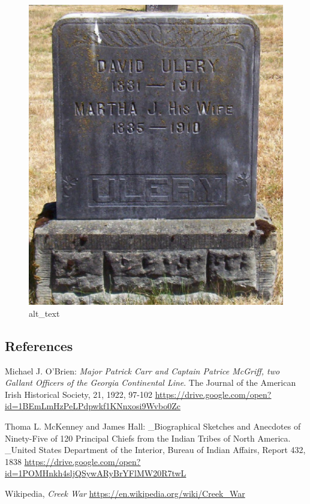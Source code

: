 \documentclass[
  12pt,
]{book}
\begin{document}
\begin{figure}
\centering
\includegraphics{images/0202b_images/image4.jpg}
\caption{alt\_text}
\end{figure}

\hypertarget{references-4}{%
\subsection{References}\label{references-4}}

Michael J. O'Brien: \emph{Major Patrick Carr and Captain Patrice McGriff, two Gallant Officers of the Georgia Continental Line}. The Journal of the American Irish Historical Society, 21, 1922, 97-102 \url{https://drive.google.com/open?id=1BEmLmHzPeLPdpwkf1KNnxosi9Wvbo0Zc}

Thoma L. McKenney and James Hall: \_Biographical Sketches and Anecdotes of Ninety-Five of 120 Principal Chiefs from the Indian Tribes of North America. \_United States Department of the Interior, Bureau of Indian Affairs, Report 432, 1838 \url{https://drive.google.com/open?id=1POMHnkh4sljQSywARyBrYFlMW20R7twL}

Wikipedia, \emph{Creek War }\url{https://en.wikipedia.org/wiki/Creek_War}
\end{document}
